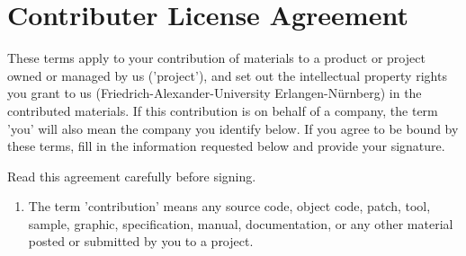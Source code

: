 \documentclass[12pt,a4paper,twoside,openright]{report}
\begin{document}
\chapter*{Contributer License Agreement}\label{chapter:cla}

These terms apply to your contribution of materials to a product or project owned or managed by us ('project'), and set out the intellectual property rights you grant to us (Friedrich-Alexander-University Erlangen-Nürnberg) in the contributed materials. If this contribution is on behalf of a company, the term 'you' will also mean the company you identify below. If you agree to be bound by these terms, fill in the information requested below and provide your signature.

Read this agreement carefully before signing.

\begin{enumerate}[noitemsep,topsep=0pt]
    \item The term 'contribution' means any source code, object code, patch, tool, sample, graphic, specification, manual, documentation, or any other material posted or submitted by you to a project.


\end{enumerate}
\end{document}
